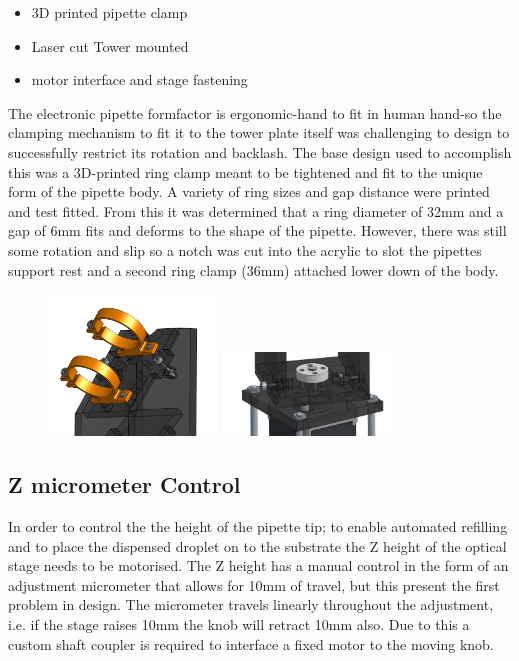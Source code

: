 \begin{itemize}
    \item 3D printed pipette clamp
    \item Laser cut Tower mounted
    \item motor interface and stage fastening
\end{itemize}

The electronic pipette formfactor is ergonomic-hand to fit in human hand-so the clamping mechanism to fit it to the tower plate itself was challenging to design to successfully restrict its rotation and backlash.
The base design used to accomplish this was a 3D-printed ring clamp meant to be tightened and fit to the unique form of the pipette body. A variety of ring sizes and gap distance were printed and test fitted. From this it was determined that a ring diameter of 32mm and a gap of 6mm fits and deforms to the shape of the pipette. However, there was still some rotation and slip so a notch was cut into the acrylic to slot the pipettes support rest and a second ring clamp (36mm) attached lower down of the body.

\begin{figure}
    \centering
    \includegraphics[width=0.4\textwidth]{img/pip_clamp.png}
    \includegraphics[width=0.4\textwidth]{img/tower_mount.png}
\end{figure}

\subsection{Z micrometer Control}

In order to control the the height of the pipette tip; to enable automated refilling and to place the dispensed droplet on to the substrate the Z height of the optical stage needs to be motorised. The Z height has a manual control in the form of an adjustment micrometer that allows for 10mm of travel, but this present the first problem in design.
The micrometer travels linearly throughout the adjustment, i.e. if the stage raises 10mm the knob will retract 10mm also. Due to this a custom shaft coupler is required to interface a fixed motor to the moving knob.

